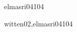 \begin{syllabus}
\begin{unit}{\IMMultimediaSystemsDef}{elmasri04}{10}{4}
    \IMMultimediaSystemsAllTopics%
    \IMMultimediaSystemsAllObjectives%
\end{unit}

\begin{unit}{\IMDigitalLibrariesDef}{witten02,elmasri04}{10}{4}
    \IMDigitalLibrariesAllTopics%
    \IMDigitalLibrariesAllObjectives%
\end{unit}



\begin{coursebibliography}
\end{coursebibliography}

\end{syllabus}
